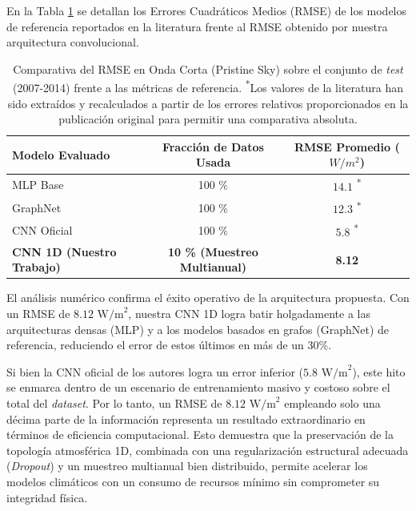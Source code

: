\documentclass[11pt,a4paper,twoside,pdf]{article}
\numberwithin{equation}{section}
\begin{document}
En la Tabla \ref{tab:estado_arte} se detallan los Errores Cuadráticos Medios (RMSE) de los modelos de referencia reportados en la literatura frente al RMSE obtenido por nuestra arquitectura convolucional.

\begin{table}[htbp]
    \centering
    \renewcommand{\arraystretch}{1.3} %
    \begin{tabular}{|l|c|c|}
        \hline
        \textbf{Modelo Evaluado} & \textbf{Fracción de Datos Usada} & \textbf{RMSE Promedio ($W/m^2$)} \\
        \hline
        MLP Base \cite{ClimART2021} & 100 \% & $14.1$ \textsuperscript{*} \\
        \hline
        GraphNet \cite{ClimART2021} & 100 \% & $12.3$ \textsuperscript{*} \\
        \hline
        CNN Oficial \cite{ClimART2021} & 100 \% & $5.8$ \textsuperscript{*} \\
        \hline
        \textbf{CNN 1D (Nuestro Trabajo)} & \textbf{10 \% (Muestreo Multianual)} & \textbf{8.12} \\
        \hline
    \end{tabular}
    \caption{Comparativa del RMSE en Onda Corta (Pristine Sky) sobre el conjunto de \textit{test} (2007-2014) frente a las métricas de referencia. \textsuperscript{*}Los valores de la literatura han sido extraídos y recalculados a partir de los errores relativos proporcionados en la publicación original para permitir una comparativa absoluta.}
    \label{tab:estado_arte}
\end{table}

El análisis numérico confirma el éxito operativo de la arquitectura propuesta. Con un RMSE de $8.12\text{ W/m}^2$, nuestra CNN 1D logra batir holgadamente a las arquitecturas densas (MLP) y a los modelos basados en grafos (GraphNet) de referencia, reduciendo el error de estos últimos en más de un 30\%. 

Si bien la CNN oficial de los autores logra un error inferior ($5.8\text{ W/m}^2$), este hito se enmarca dentro de un escenario de entrenamiento masivo y costoso sobre el total del \textit{dataset}. Por lo tanto, un RMSE de $8.12\text{ W/m}^2$ empleando solo una décima parte de la información representa un resultado extraordinario en términos de eficiencia computacional. Esto demuestra que la preservación de la topología atmosférica 1D, combinada con una regularización estructural adecuada (\textit{Dropout}) y un muestreo multianual bien distribuido, permite acelerar los modelos climáticos con un consumo de recursos mínimo sin comprometer su integridad física.
\end{document}
